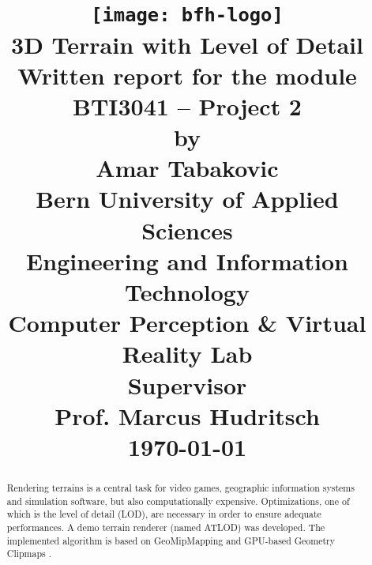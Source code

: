 \documentclass[10pt,a4paper]{report}
\begin{document}
\title{
\vspace{-80px}
\texttt{[image: bfh-logo]}\\
\vspace{80px}
\huge\textsf{\textbf{3D Terrain with Level of Detail}}\\
\vspace{50px}
\large{Written report for the module\\
BTI3041 -- Project 2\\ 
by\\}
\vspace{20px}
\Large{Amar Tabakovic\\}
\vspace{40px}
\large{
\textbf{Bern University of Applied Sciences}\\
  Engineering and Information Technology\\
  Computer Perception \& Virtual Reality Lab
\\
\vspace{20px}
\textbf{Supervisor}\\
Prof. Marcus Hudritsch}\\
\vspace{30px}
\today
}
\date{}
\maketitle

\begin{abstract}
 Rendering terrains is a central task for video games, geographic information systems and simulation software, 
 but also computationally expensive. Optimizations, one of which is the level of detail (LOD),
 are necessary in order to ensure adequate performances.
 A demo terrain renderer (named ATLOD) was developed. The implemented algorithm 
 is based on GeoMipMapping \cite{geomipmapping} and GPU-based Geometry Clipmaps \cite{gpugeomclipmaps}.
\end{abstract}

\tableofcontents

\listoftables
\listoffigures
\lstlistoflistings









\end{document}
